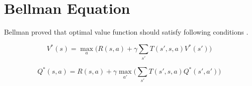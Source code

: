 \section{Bellman Equation}

Bellman proved that optimal value function should satisfy following conditions \cite{bellman_dynamic_2003}.

\begin{equation}
\label{eqn:bellman_v}
V^{*}(s) = \max_{a} \big( R(s,a) + \gamma \sum_{s'} T(s',s,a) V^{*}(s') \big)
\end{equation}

\begin{equation}
\label{eqn:bellman_q}
Q^{*}(s,a) = R(s,a) + \gamma \max_{a'} \big( \sum_{s'} T(s',s,a) Q^{*}(s',a') \big)
\end{equation}

